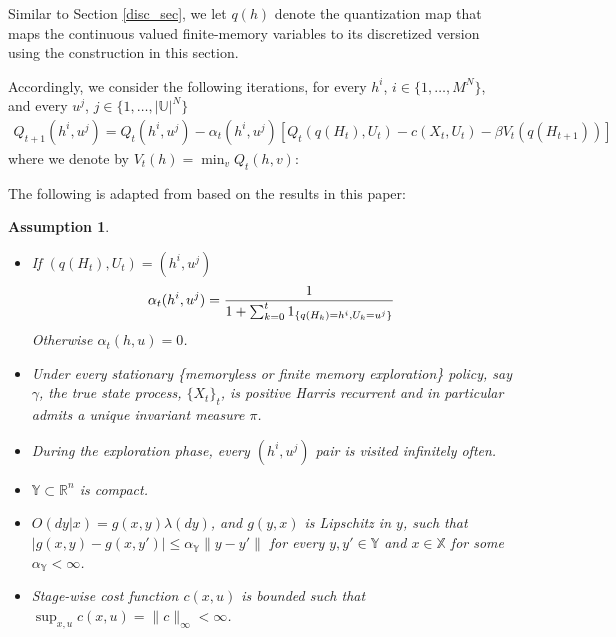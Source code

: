 \documentclass[11pt]{article}
\newtheorem{assumption}{Assumption}
\begin{document}
Similar to Section \ref{disc_sec}, we let $q(h)$ denote the quantization map that maps the continuous valued finite-memory variables to its discretized version using the construction in this section. 

 Accordingly, we consider the following iterations, for every $h^i$, $i\in\{1,\dots,M^N\}$, and every $u^j$, $j\in\{1,\dots,|\mathds{U}|^N\}$
\begin{align}\label{opt_iter_pomdp}
Q_{t+1}(h^i,u^j) = Q_t(h^i,u^j) - \alpha_t(h^i,u^j) \left[ Q_t(q(H_t),{U}_t) - c(X_t,U_t) - \beta V_t(q(H_{t+1})) \right]
\end{align}
 where we denote by $V_t(h)=\min_v Q_t(h,v)$:




The following is adapted from   \cite{devran2025near} based on the results in this paper:

\begin{assumption}\label{partial_q}
\hfill
\begin{itemize}
\item [1.] If $(q(H_t),U_t)=(h^i,u^j)$
\[\alpha_t(h^i,u^j) = {1 \over 1+ \sum_{k=0}^{t} 1_{\{q(H_k)=h^i, U_k=u^j\}} }\]
Otherwise $\alpha_t(h,u)=0$.%
\item [2.] Under every stationary \{memoryless or finite memory exploration\} policy, say $\gamma$, the true state process, $\{X_t\}_t$, is positive Harris recurrent and in particular admits a unique invariant measure $\pi$.
\item [3.] During the exploration phase, every $(h^i,u^j)$ pair is visited infinitely often.
\item[4.] {$\mathds{Y}\subset\mathds{R}^n$} is compact.
\item[5.] $O(dy|x)=g(x,y)\lambda(dy)$, and $g(y,x)$ is Lipschitz in $y$, such that $|g(x,y)-g(x,y')|\leq\alpha_{\mathds{Y}} \|y-y'\|$ for every $y,y'\in\mathds{Y}$ and $x\in\mathds{X}$ for some $\alpha_{\mathds{Y}}<\infty$.
\item[6.] Stage-wise cost function $c(x,u)$ is bounded such that $\sup_{x,u}c(x,u)=\|c\|_\infty<\infty$.
\end{itemize}
\end{assumption}
\end{document}

